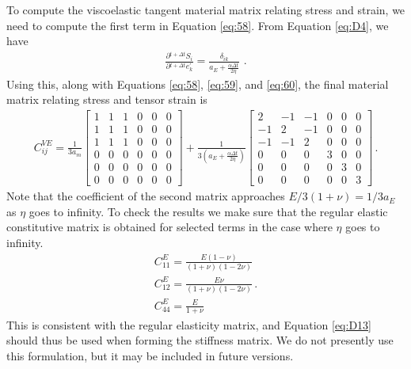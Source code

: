 To compute the viscoelastic tangent material matrix relating stress
and strain, we need to compute the first term in Equation \vref{eq:58}.
From Equation \vref{eq:D4}, we have
\begin{gather}
\frac{\partial\phantom{}^{t+\Delta t}S_{i}}{\partial\phantom{}^{t+\Delta t}e_{k}^{\prime}}=\frac{\delta_{ik}}{a_{E}+\frac{\alpha\Delta t}{2\eta}}\,\,.\label{eq:D12}
\end{gather}
Using this, along with Equations \vref{eq:58}, \vref{eq:59}, and \vref{eq:60},
the final material matrix relating stress and tensor strain is
\begin{gather}
C_{ij}^{VE}=\frac{1}{3a_{m}}\left[\begin{array}{cccccc}
1 & 1 & 1 & 0 & 0 & 0\\
1 & 1 & 1 & 0 & 0 & 0\\
1 & 1 & 1 & 0 & 0 & 0\\
0 & 0 & 0 & 0 & 0 & 0\\
0 & 0 & 0 & 0 & 0 & 0\\
0 & 0 & 0 & 0 & 0 & 0
\end{array}\right]+\frac{1}{3\left(a_{E}+\frac{\alpha\Delta t}{2\eta}\right)}\left[\begin{array}{cccccc}
2 & -1 & -1 & 0 & 0 & 0\\
-1 & 2 & -1 & 0 & 0 & 0\\
-1 & -1 & 2 & 0 & 0 & 0\\
0 & 0 & 0 & 3 & 0 & 0\\
0 & 0 & 0 & 0 & 3 & 0\\
0 & 0 & 0 & 0 & 0 & 3
\end{array}\right]\,.\label{eq:D13}
\end{gather}
Note that the coefficient of the second matrix approaches $E/3(1+\nu)=1/3a_{E}$
as $\eta$ goes to infinity. To check the results we make sure that
the regular elastic constitutive matrix is obtained for selected terms
in the case where $\eta$ goes to infinity.
\begin{gather}
C_{11}^{E}=\frac{E(1-\nu)}{(1+\nu)(1-2\nu)}\,\,\nonumber \\
C_{12}^{E}=\frac{E\nu}{(1+\nu)(1-2\nu)}\,.\label{eq:D14}\\
C_{44}^{E}=\frac{E}{1+\nu}\,\,\nonumber 
\end{gather}
This is consistent with the regular elasticity matrix, and Equation
\vref{eq:D13} should thus be used when forming the stiffness matrix.
We do not presently use this formulation, but it may be included in
future versions.

